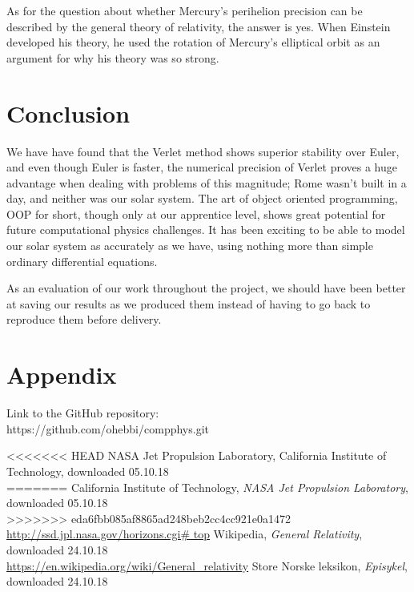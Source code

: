 \documentclass{article}
\begin{document}
\vskip0.5cm
As for the question about whether Mercury's perihelion precision can be described by the general theory of relativity, the answer is yes. When Einstein developed his theory, he used the rotation of Mercury's elliptical orbit as an argument for why his theory was so strong. \cite{wiki_rel}



\section{Conclusion}

We have have found that the Verlet method shows superior stability over Euler, and even though Euler is faster, the numerical precision of Verlet proves a huge advantage when dealing with problems of this magnitude; Rome wasn't built in a day, and neither was our solar system. The art of object oriented programming, OOP for short, though only at our apprentice level, shows great potential for future computational physics challenges. It has been exciting to be able to model our solar system as accurately as we have, using nothing more than simple ordinary differential equations. 

As an evaluation of our work throughout the project, we should have been better at saving our results as we produced them instead of having to go back to reproduce them before delivery.


\section{Appendix}
Link to the GitHub repository:\\

https://github.com/ohebbi/compphys.git

\begin{thebibliography}{}
<<<<<<< HEAD
NASA Jet Propulsion Laboratory, California Institute of Technology, downloaded 05.10.18\\
=======
California Institute of Technology, \textit{NASA Jet Propulsion Laboratory}, downloaded 05.10.18\\
>>>>>>> eda6fbb085af8865ad248beb2cc4cc921e0a1472
\url{http://ssd.jpl.nasa.gov/horizons.cgi# top}
Wikipedia, \textit{General Relativity}, downloaded 24.10.18\\
\url{https://en.wikipedia.org/wiki/General_relativity}
Store Norske leksikon, \textit{Episykel}, downloaded 24.10.18\\
\end{thebibliography}
\end{document}
